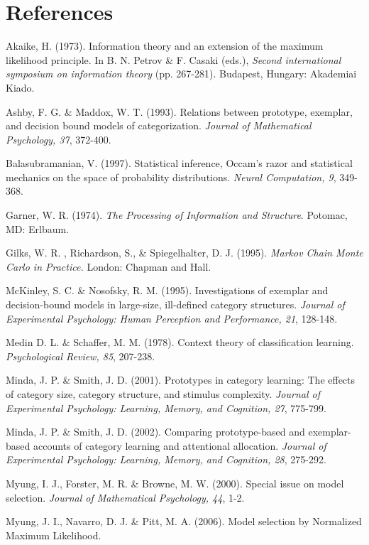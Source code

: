 \documentclass[11pt]{article}
\begin{document}
\section*{References}
\small
\begin{list}{}{\setlength{\leftmargin}{10pt}\setlength{\itemindent}{-10pt}\setlength{\parsep}{-1pt}}
\item Akaike, H. (1973). Information theory and an extension of the maximum likelihood principle. In B.
N. Petrov \& F. Casaki (eds.), {\it Second international symposium on information theory} (pp.
267-281). Budapest, Hungary: Akademiai Kiado.
\item Ashby, F. G. \& Maddox, W. T. (1993). Relations between prototype, exemplar, and decision bound
models of categorization. {\it Journal of Mathematical Psychology, 37}, 372-400.
\item Balasubramanian, V. (1997). Statistical inference, Occam's razor and statistical mechanics on the space
of probability distributions. {\it Neural Computation, 9}, 349-368.
\item Garner, W. R. (1974). {\it The Processing of Information and Structure}. Potomac, MD: Erlbaum.
\item Gilks, W. R. , Richardson, S., \& Spiegelhalter, D. J. (1995). {\it Markov Chain Monte Carlo in Practice.}
London: Chapman and Hall.
\item McKinley, S. C. \& Nosofsky, R. M. (1995). Investigations of exemplar and decision-bound models in
large-size, ill-defined category structures. {\it Journal of Experimental Psychology: Human
Perception and Performance, 21}, 128-148.
\item Medin D. L. \& Schaffer, M. M. (1978). Context theory of classification learning. {\it Psychological
Review, 85}, 207-238.
\item Minda, J. P. \& Smith, J. D. (2001). Prototypes in category learning: The effects of category
size, category structure, and stimulus complexity. {\it Journal of Experimental Psychology:
Learning, Memory, and Cognition, 27}, 775-799.
\item Minda, J. P. \& Smith, J. D. (2002). Comparing prototype-based and exemplar-based accounts of
category learning and attentional allocation. {\it Journal of Experimental Psychology: Learning,
Memory, and Cognition, 28}, 275-292.
\item Myung, I. J., Forster, M. R. \& Browne, M. W. (2000). Special issue on model selection. {\it
Journal of Mathematical Psychology, 44}, 1-2.
\item Myung, J. I., Navarro, D. J. \& Pitt, M. A. (2006). Model selection by Normalized Maximum Likelihood.

\end{list}
\end{document}

